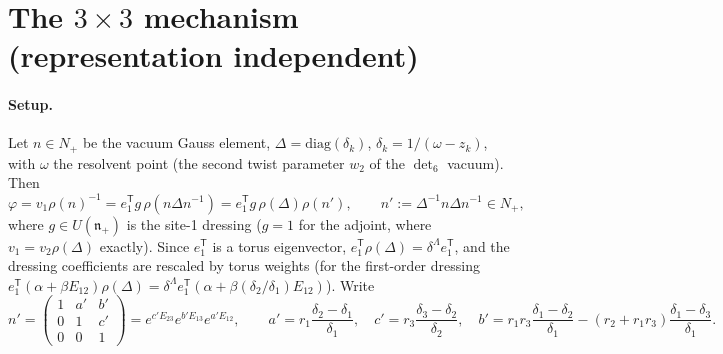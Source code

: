 \documentclass[11pt]{article}
\newcommand{\eT}{e_1^{\mathsf T}}
\begin{document}
\section{The $3\times3$ mechanism (representation independent)}\label{sec:mech}

\paragraph{Setup.} Let $n\in N_+$ be the vacuum Gauss element, $\Delta=\mathrm{diag}(\delta_k)$, $\delta_k=1/(\omega-z_k)$, with $\omega$ the resolvent point (the second twist parameter $w_2$ of the $\det_6$ vacuum). Then
\[
\varphi=v_1\rho(n)^{-1}=\eT g\,\rho(n\Delta n^{-1})=\eT g\,\rho(\Delta)\rho(n'),\qquad n':=\Delta^{-1}n\Delta n^{-1}\in N_+,
\]
where $g\in U(\mathfrak n_+)$ is the site-1 dressing ($g=1$ for the adjoint, where $v_1=v_2\rho(\Delta)$ exactly). Since $\eT$ is a torus eigenvector, $\eT\rho(\Delta)=\delta^\Lambda\eT$, and the dressing coefficients are rescaled by torus weights (for the first-order dressing $\eT(\alpha+\beta E_{12})\rho(\Delta)=\delta^\Lambda\eT(\alpha+\beta(\delta_2/\delta_1)E_{12})$). Write
\[
n'=\begin{pmatrix}1&a'&b'\\0&1&c'\\0&0&1\end{pmatrix}=e^{c'E_{23}}e^{b'E_{13}}e^{a'E_{12}},\qquad
a'=r_1\frac{\delta_2-\delta_1}{\delta_1},\quad c'=r_3\frac{\delta_3-\delta_2}{\delta_2},\quad b'=r_1r_3\frac{\delta_1-\delta_2}{\delta_1}-(r_2+r_1r_3)\frac{\delta_1-\delta_3}{\delta_1}.
\]
\end{document}
